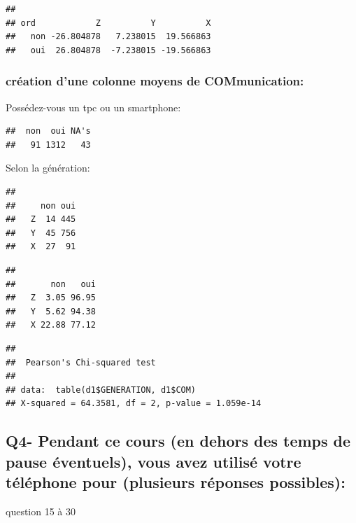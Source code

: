 \documentclass[]{article}
\begin{document}
\begin{verbatim}
##      
## ord            Z          Y          X
##   non -26.804878   7.238015  19.566863
##   oui  26.804878  -7.238015 -19.566863
\end{verbatim}

\subsubsection{création d'une colonne moyens de
COMmunication:}\label{creation-dune-colonne-moyens-de-communication}

Possédez-vous un tpc ou un smartphone:

\begin{verbatim}
##  non  oui NA's 
##   91 1312   43
\end{verbatim}

Selon la génération:

\begin{verbatim}
##    
##     non oui
##   Z  14 445
##   Y  45 756
##   X  27  91
\end{verbatim}

\begin{verbatim}
##    
##       non   oui
##   Z  3.05 96.95
##   Y  5.62 94.38
##   X 22.88 77.12
\end{verbatim}

\begin{verbatim}
## 
##  Pearson's Chi-squared test
## 
## data:  table(d1$GENERATION, d1$COM)
## X-squared = 64.3581, df = 2, p-value = 1.059e-14
\end{verbatim}

\subsection{Q4- Pendant ce cours (en dehors des temps de pause
éventuels), vous avez utilisé votre téléphone pour (plusieurs réponses
possibles):}\label{q4--pendant-ce-cours-en-dehors-des-temps-de-pause-eventuels-vous-avez-utilise-votre-telephone-pour-plusieurs-reponses-possibles}

question 15 à 30
\end{document}
